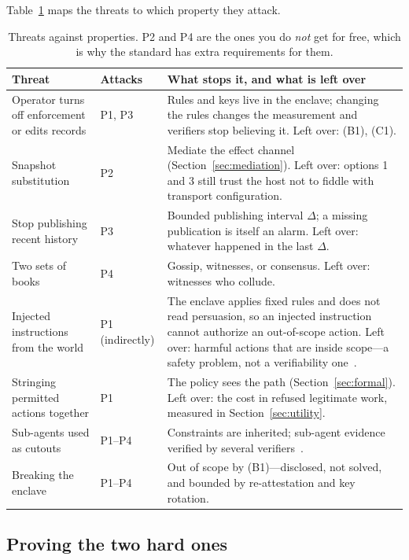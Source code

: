 \documentclass[11pt]{article}
\begin{document}
Table~\ref{tab:threats} maps the threats to which property they attack.

\begin{table}[ht]
\centering\footnotesize
\begin{tabular}{@{}p{4.0cm}p{1.5cm}p{8.2cm}@{}}
\toprule
\textbf{Threat} & \textbf{Attacks} & \textbf{What stops it, and what is left over} \\
\midrule
Operator turns off enforcement or edits records & P1, P3 &
Rules and keys live in the enclave; changing the rules changes the
measurement and verifiers stop believing it. Left over: (B1), (C1). \\
Snapshot substitution & P2 &
Mediate the effect channel (Section~\ref{sec:mediation}). Left over: options 1
and 3 still trust the host not to fiddle with transport configuration. \\
Stop publishing recent history & P3 &
Bounded publishing interval $\Delta$; a missing publication is itself an
alarm. Left over: whatever happened in the last $\Delta$. \\
Two sets of books & P4 &
Gossip, witnesses, or consensus. Left over: witnesses who collude. \\
Injected instructions from the world & P1 (indirectly) &
The enclave applies fixed rules and does not read persuasion, so an injected
instruction cannot authorize an out-of-scope action. Left over: harmful
actions that are inside scope---a safety problem, not a verifiability
one~\cite{greshake2023,toolemu}. \\
Stringing permitted actions together & P1 &
The policy sees the path (Section~\ref{sec:formal}). Left over: the cost in
refused legitimate work, measured in Section~\ref{sec:utility}. \\
Sub-agents used as cutouts & P1--P4 &
Constraints are inherited; sub-agent evidence verified by several
verifiers~\cite{multiverifier}. \\
Breaking the enclave & P1--P4 &
Out of scope by (B1)---disclosed, not solved, and bounded by re-attestation
and key rotation. \\
\bottomrule
\end{tabular}
\caption{Threats against properties. P2 and P4 are the ones you do
\emph{not} get for free, which is why the standard has extra requirements for
them.}
\label{tab:threats}
\end{table}

\subsection{Proving the two hard ones}
\label{sec:proofs}
\end{document}
